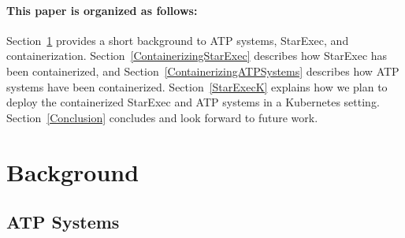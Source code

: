 \documentclass{easychair}
\begin{document}
\paragraph{This paper is organized as follows:}
Section~\ref{Background} provides a short background to ATP systems, StarExec, and 
containerization.
Section~\ref{ContainerizingStarExec} describes how StarExec has been containerized, and
Section~\ref{ContainerizingATPSystems} describes how ATP systems have been containerized.
Section~\ref{StarExecK} explains how we plan to deploy the containerized StarExec
and ATP systems in a Kubernetes setting.
Section~\ref{Conclusion} concludes and look forward to future work.

\section{Background}
\label{Background}

\subsection{ATP Systems}
\label{ATPSystems}
\end{document}
